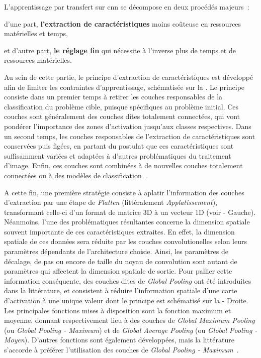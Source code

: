 L'apprentissage par transfert sur \gls{cnn} se décompose en deux procédés majeurs~: 
\begin{inlinerate}
    \item d'une part, \textbf{l'extraction de caractéristiques} moins coûteuse en ressources matérielles et temps,
    \item et d'autre part, \textbf{le réglage fin} qui nécessite à l'inverse plus de temps et de ressources matérielles. 
\end{inlinerate}
Au sein de cette partie, le principe d'extraction de caractéristiques est développé afin de limiter les contraintes d'apprentissage, schématisée sur la . Le principe consiste dans un premier temps à retirer les couches responsables de la classification du problème cible, puisque spécifiques au problème initial. Ces couches sont généralement des couches dites totalement connectées, qui vont pondérer l'importance des zones d'activation jusqu'aux classes respectives. Dans un second temps, les couches responsables de l'extraction de caractéristiques sont conservées puis figées, en partant du postulat que ces caractéristiques sont suffisamment variées et adaptées à d'autres problématiques du traitement d'image. Enfin, ces couches sont combinées à de nouvelles couches totalement connectées ou à des modèles de classification~\cite{Litjens2017}.\par 

A cette fin, une première stratégie consiste à aplatir l'information des couches d'extraction par une étape de \textit{Flatten} (littéralement \textit{Applatissement}), transformant celle-ci d'un format de matrice 3D à un vecteur 1D (voir  - Gauche). Néanmoins, l'une des problématiques résultantes concerne la dimension spatiale souvent importante de ces caractéristiques extraites. En effet, la dimension spatiale de ces données sera réduite par les couches convolutionelles selon leurs paramètres dépendants de l'architecture choisie. Ainsi, les paramètres de décalage, de pas ou encore de taille du noyau de convolution sont autant de paramètres qui affectent la dimension spatiale de sortie. Pour pallier cette information conséquente, des couches dites de \textit{Global Pooling} ont été introduites dans la littérature, et consistent à réduire l'information spatiale d'une carte d'activation à une unique valeur dont le principe est schématisé sur la  - Droite. Les principales fonctions mises à disposition sont la fonction maximum et moyenne, donnant respectivement lieu à des couches de \textit{Global Maximum Pooling} (ou \textit{Global Pooling - Maximum}) et de \textit{Global Average Pooling} (ou \textit{Global Pooling - Moyen}). D'autres fonctions sont également développées, mais la littérature s'accorde à préférer l'utilisation des couches de \textit{Global Pooling - Maximum}~\cite{christlein2019}.\par


